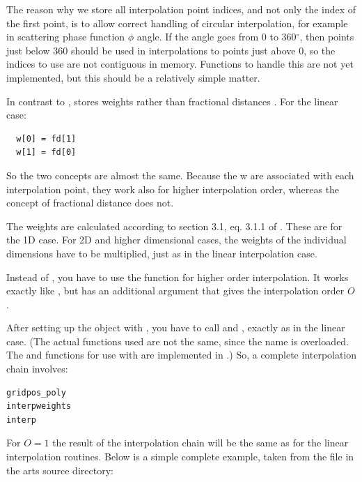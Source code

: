 The reason
why we store all interpolation point indices, and not only the index
of the first point, is to allow correct handling of circular
interpolation, for example in scattering phase function $\phi$
angle. If the angle goes from 0 to 360$^\circ$, then points just below
360 should be used in interpolations to points just above 0, so the
indices to use are not contiguous in memory. Functions to handle this
are not yet implemented, but this should be a relatively simple matter.

In contrast to ,  stores
weights  rather than fractional distances .
For the linear case:
\begin{lstlisting}
  w[0] = fd[1]
  w[1] = fd[0]
\end{lstlisting}

So the two concepts are almost the same.  Because the w are associated
with each interpolation point, they work also for higher interpolation
order, whereas the concept of fractional distance does not.

The weights are calculated according to 
section 3.1, eq. 3.1.1 of \citep{numerical_recipes_C:97}. These are
for the 1D case. For 2D and higher dimensional cases, the weights of
the individual dimensions have to be multiplied, just as in the linear
interpolation case.

Instead of , you have to use the function
 for higher order interpolation. It works
exactly like , but has an additional argument that
gives the interpolation order $O$. 

After setting up the  object with
, you have to call 
and , exactly as in the linear case. (The actual
functions used are not the same, since the name is overloaded. The
 and  functions for use
with  are implemented in
.) So, a complete interpolation chain
involves:

\begin{lstlisting}
gridpos_poly
interpweights
interp
\end{lstlisting}

For $O=1$ the result of the
interpolation chain will be the same as for the linear interpolation
routines. Below is a simple complete example, taken from
the file  in the arts source directory: 

